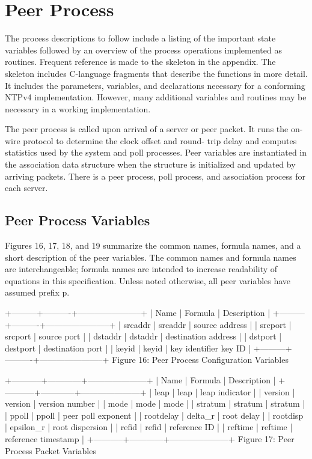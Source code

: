 \chapter{Peer Process}

The process descriptions to follow include a listing of the important
state variables followed by an overview of the process operations
implemented as routines. Frequent reference is made to the skeleton
in the appendix. The skeleton includes C-language fragments that
describe the functions in more detail. It includes the parameters,
variables, and declarations necessary for a conforming NTPv4
implementation. However, many additional variables and routines may
be necessary in a working implementation.

The peer process is called upon arrival of a server or peer packet.
It runs the on-wire protocol to determine the clock offset and round-
trip delay and computes statistics used by the system and poll
processes. Peer variables are instantiated in the association data
structure when the structure is initialized and updated by arriving
packets. There is a peer process, poll process, and association
process for each server.

\section{Peer Process Variables}

Figures 16, 17, 18, and 19 summarize the common names, formula names,
and a short description of the peer variables. The common names and
formula names are interchangeable; formula names are intended to
increase readability of equations in this specification. Unless
noted otherwise, all peer variables have assumed prefix p.

+---------+----------+-----------------------+
| Name | Formula | Description |
+---------+----------+-----------------------+
| srcaddr | srcaddr | source address |
| srcport | srcport | source port |
| dstaddr | dstaddr | destination address |
| dstport | destport | destination port |
| keyid | keyid | key identifier key ID |
+---------+----------+-----------------------+
Figure 16: Peer Process Configuration Variables

+-----------+------------+---------------------+
| Name | Formula | Description |
+-----------+------------+---------------------+
| leap | leap | leap indicator |
| version | version | version number |
| mode | mode | mode |
| stratum | stratum | stratum |
| ppoll | ppoll | peer poll exponent |
| rootdelay | delta\_r | root delay |
| rootdisp | epsilon\_r | root dispersion |
| refid | refid | reference ID |
| reftime | reftime | reference timestamp |
+-----------+------------+---------------------+
Figure 17: Peer Process Packet Variables

